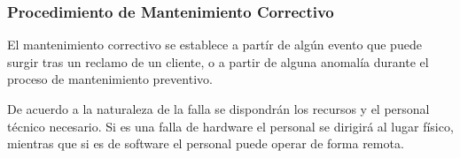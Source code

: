 %
%
%
%
%
%
%
%
%
%
%
%
%
%
%
%
%
%
%





\subsubsection{Procedimiento de Mantenimiento Correctivo}
%
%
%

El mantenimiento correctivo se establece a partír de algún evento que puede surgir tras un 
reclamo de un cliente, o a partir de alguna anomalía durante el proceso de mantenimiento 
preventivo.

De acuerdo a la naturaleza de la falla se dispondrán los recursos y el personal técnico 
necesario. Si es una falla de hardware el personal se dirigirá al lugar físico, mientras
que si es de software el personal puede operar de forma remota.


